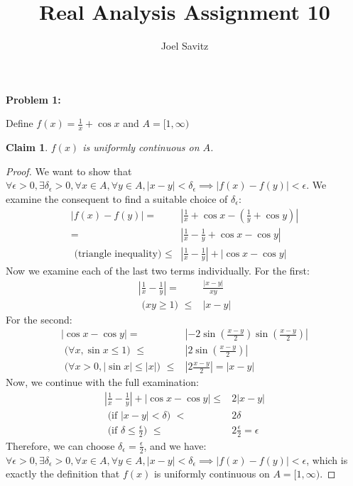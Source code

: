 \documentclass{article}
\title{Real Analysis Assignment 10}
\author{Joel Savitz}
\newcommand{\eps}{\ensuremath{\epsilon}}
\newcommand{\pt}[1]{\textrm{ #1 }}
\newtheorem{clm}{Claim}
\begin{document}
\maketitle

\textbf{Problem 1:}

Define $f(x) = \frac{1}{x} + \cos x$ and $A = [1,\infty)$

\begin{clm}
	$f(x)$ is uniformly continuous on $A$.
\end{clm}

\begin{proof}
	We want to show that
	$\forall \eps > 0,
	\exists \delta_\eps > 0,
	\forall x \in A, \forall y \in A,
	|x - y| < \delta_\eps
	\implies |f(x) - f(y)| < \eps$.
	We examine the consequent to find a suitable choice of $\delta_\eps$:
	\begin{align}
		|f(x) - f(y)| = & |\frac{1}{x} + \cos x - (\frac{1}{y} + \cos y)| \\
		= & |\frac{1}{x} - \frac{1}{y} + \cos x - \cos y| \\
		\pt{(triangle inequality)} \le & |\frac{1}{x} - \frac{1}{y}| + |\cos x - \cos y|
	\end{align}
	Now we examine each of the last two terms individually. For the first:
	\begin{align}
		|\frac{1}{x} - \frac{1}{y}| = & \frac{|x - y|}{xy} \\
		\pt{($xy \geq 1$)} \le & |x - y|
	\end{align}
	For the second:
	\begin{align}
		|\cos x - \cos y| = & |-2 \sin(\frac{x - y}{2})\sin(\frac{x - y}{2})| \\
		\pt{($\forall x, \sin x \le 1$)} \le & |2 \sin(\frac{x - y}{2})| \\
		\pt{($\forall x > 0, | \sin x | \le |x|$)} \le & |2 \frac{x - y}{2}| = |x - y|
	\end{align}
	Now, we continue with the full examination:
	\begin{align}
		|\frac{1}{x} - \frac{1}{y}| + |\cos x - \cos y| \le & 2|x - y| \\
		\pt{(if $|x - y| < \delta$)} < & 2\delta \\
		\pt{(if $\delta \le \frac{\eps}{2}$)} \le & 2 \frac{\eps}{2} = \eps
	\end{align}
	Therefore, we can choose $\delta_\eps = \frac{\eps}{2}$,
	and we have:
	$\forall \eps > 0,
	\exists \delta_\eps > 0,
	\forall x \in A, \forall y \in A,
	|x - y| < \delta_\eps
	\implies |f(x) - f(y)| < \eps$,
	which is exactly the definition that
	$f(x)$ is uniformly continuous on $A = [1, \infty)$.
\end{proof}
\end{document}

